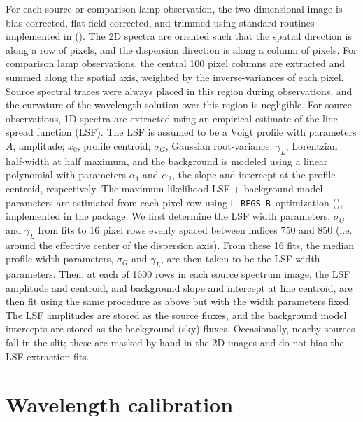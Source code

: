 \documentclass[modern, letterpaper]{aastex61}
\newcommand{\lbfgsb}{\texttt{L-BFGS-B}}
\begin{document}
For each source or comparison lamp observation, the two-dimensional image is
bias corrected, flat-field corrected, and trimmed using standard routines
implemented in  (\citealt{Craig:2015}).
The 2D spectra are oriented such that the spatial direction is along a row of
pixels, and the dispersion direction is along a column of pixels.
For comparison lamp observations, the central 100 pixel columns are extracted
and summed along the spatial axis, weighted by the inverse-variances of each
pixel.
Source spectral traces were always placed in this region during observations,
and the curvature of the wavelength solution over this region is negligible.
For source observations, 1D spectra are extracted using an empirical
estimate of the line spread function (LSF).
The LSF is assumed to be a Voigt profile with parameters $A$, amplitude; $x_0$,
profile centroid; $\sigma_G$, Gaussian root-variance; $\gamma_L$, Lorentzian
half-width at half maximum, and the background is modeled using a linear
polynomial with parameters $\alpha_1$ and $\alpha_2$, the slope and intercept
at the profile centroid, respectively.
The maximum-likelihood LSF + background model parameters are estimated from
each pixel row using \lbfgsb\ optimization (\citealt{Zhu:1994}), implemented in
the  package.
We first determine the LSF width parameters, $\sigma_G$ and $\gamma_L$ from fits
to 16 pixel rows evenly spaced between indices 750 and 850 (i.e. around the
effective center of the dispersion axis).
From these 16 fits, the median profile width parameters, $\sigma_G$ and
$\gamma_L$, are then taken to be the LSF width parameters.
Then, at each of 1600 rows in each source spectrum image, the LSF amplitude and
centroid, and background slope and intercept at line centroid, are then fit
using the same procedure as above but with the width parameters fixed.
The LSF amplitudes are stored as the source fluxes, and the background model
intercepts are stored as the background (sky) fluxes.
Occasionally, nearby sources fall in the slit; these are masked by hand in the
2D images and do not bias the LSF extraction fits.

\section{Wavelength calibration}
\end{document}
